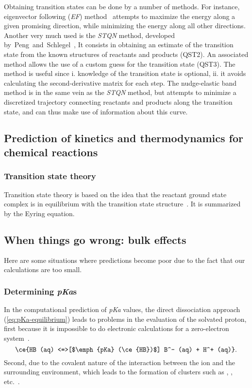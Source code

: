 Obtaining transition states can be done by a number of methods.
For instance, eigenvector following (\emph{EF})
method~\cite{Banerjee_1985,Schlegel_1987,Mauro_2005}
attempts to maximize the energy along a given promising direction, while
minimizing the energy along all other directions.
Another very much used is the \emph{STQN} method, developed
by~Peng~and~Schlegel~\cite{Peng_1993,Peng_1996},
It consists in obtaining an estimate of the transition state from the known
structures of reactants and products (QST2).
An associated method allows the use of a custom guess for the transition state
(QST3).
The method is useful since
i. knowledge of the transition state is optional,
ii. it avoids calculating the second-derivative matrix for each step.
The nudge-elastic band method is in the same vein as the \emph{STQN} method,
but attempts to minimize a discretized trajectory connecting reactants and
products along the transition state, and can thus make use of information about
this curve.

\subsection{Prediction of kinetics and thermodynamics for chemical reactions}

\subsubsection{Transition state theory}\label{sec:tst}

Transition state theory
is based on the idea that the reactant ground state complex is in equilibrium
with the transition state structure~\cite{TransitionStateTheory}.
It is summarized by the Eyring equation.

\subsection{When things go wrong: bulk effects}

Here are some situations where predictions become poor due to the fact that our
calculations are too small.

\subsubsection{Determining \emph{pKa}s}\label{sec:pka}

In the computational prediction of \emph{pKa} values,
the direct dissociation approach (\autoref{eq:pKa-equilibrium})
leads to problems in the evaluation of the solvated proton,
first because it is impossible to do electronic calculations for a zero-electron
system~\cite{Ding_2009,Sumon_2012}.
%
\begin{equation}
  \ce{HB (aq) <=>[$\emph{pKa} (\ce{HB})$] B^- (aq) + H^+ (aq)}\text{.}
  \label{eq:pKa-equilibrium}
\end{equation}
%
Second, due to the covalent nature of the interaction between the  ion
and the surrounding environment, which leads to the formation of clusters such
as , , etc.~\cite{Sumon_2012}.

